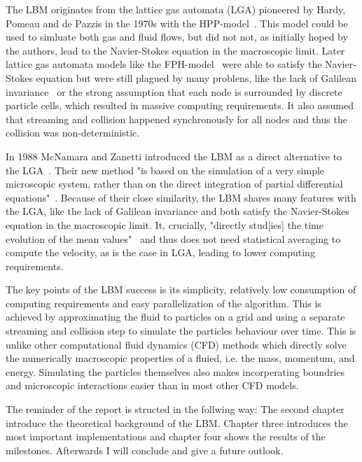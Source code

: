 \documentclass[a4paper,12pt, oneside]{book}
\begin{document}
The LBM originates from the lattice gas automata (LGA) pioneered by Hardy, Pomeau and de Pazzis in the 1970s with the HPP-model~\cite{hardy1973timeHPP}.
This model could be used to simluate both gas and fluid flows, but did not not, as initially hoped by the authors, lead to the Navier-Stokes equation in the macroscopic limit.
Later lattice gas automata models like the FPH-model~\cite{PhysRevLett.56.1505-fhp} were able to satisfy the Navier-Stokes equation but were still plagued by many problens, like the lack of Galilean invariance~\cite{nie2008galileanInvariance} or the strong assumption
that each node is surrounded by discrete particle cells, which resulted in massive computing requirements.
It also assumed that streaming and collision happened synchronously for all nodes and thus the collision was non-deterministic.

In 1988 McNamara and Zanetti introduced the LBM as a direct alternative to the LGA~\cite{mcnamara1988boltzmann-method}.
Their new method "is based on the simulation of a very simple microscopic system, rather than on the direct integration of partial differential equations"~\cite{mcnamara1988boltzmann-method}.
Because of their close similarity, the LBM shares many features with the LGA, like the lack of Galilean invariance and both satisfy the Navier-Stokes equation in the macroscopic limit.
It, crucially, "directly stud[ies] the time evolution of the mean values"~\cite{mcnamara1988boltzmann-method} and thus does not need statistical averaging to compute the velocity, as is the case in LGA, leading to lower computing requirements.

The key points of the LBM success is its simplicity, relatively low consumption of computing requirements and easy parallelization of the algorithm.
This is achieved by approximating the fluid to particles on a grid and using a separate streaming and collision step to simulate the particles behaviour over time.
This is unlike other computational fluid dynamics (CFD) methods which directly solve the numerically macroscopic properties of a fluied, i.e. the mass, momentum, and energy.
Simulating the particles themselves also makes incorperating boundries and microscopic interactions easier than in most other CFD models.

The reminder of the report is structed in the follwing way: The second chapter introduce the theoretical background of the LBM. Chapter three introduces the most important implementations and chapter four shows the results of the milestones.
Afterwards I will conclude and give a future outlook.
\end{document}
